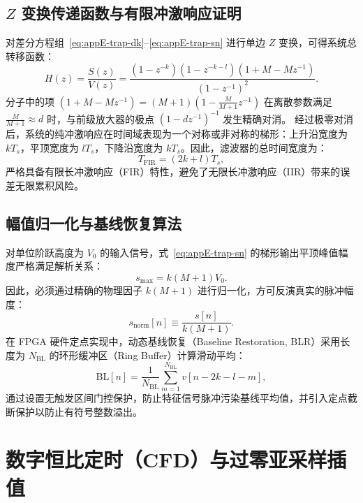 \subsection{$Z$ 变换传递函数与有限冲激响应证明}

对差分方程组~\eqref{eq:appE-trap-dk}--\eqref{eq:appE-trap-sn} 进行单边 $Z$ 变换，可得系统总转移函数：
\begin{equation}\label{eq:appE-trap-z-transform}
H(z) = \frac{S(z)}{V(z)} = \frac{(1 - z^{-k})(1 - z^{-k-l})(1 + M - M z^{-1})}{(1 - z^{-1})^2}.
\end{equation}
分子中的项 $(1 + M - M z^{-1}) = (M+1)(1 - \frac{M}{M+1} z^{-1})$ 在离散参数满足 $\frac{M}{M+1} \approx d$ 时，与前级放大器的极点 $(1 - d z^{-1})^{-1}$ 发生精确对消。
经过极零对消后，系统的纯冲激响应在时间域表现为一个对称或非对称的梯形：上升沿宽度为 $k T_s$，平顶宽度为 $l T_s$，下降沿宽度为 $k T_s$。因此，滤波器的总时间宽度为：
\begin{equation}\label{eq:appE-fir-length}
T_{\mathrm{FIR}} = (2k + l) T_s,
\end{equation}
严格具备有限长冲激响应（FIR）特性，避免了无限长冲激响应（IIR）带来的误差无限累积风险。

\subsection{幅值归一化与基线恢复算法}

对单位阶跃高度为 $V_0$ 的输入信号，式~\eqref{eq:appE-trap-sn} 的梯形输出平顶峰值幅度严格满足解析关系：
\begin{equation}\label{eq:appE-peak-amplitude}
s_{\max} = k (M + 1) V_0.
\end{equation}
因此，必须通过精确的物理因子 $k(M+1)$ 进行归一化，方可反演真实的脉冲幅度：
\begin{equation}\label{eq:appE-snorm}
s_{\mathrm{norm}}[n] \equiv \frac{s[n]}{k(M + 1)}.
\end{equation}
在 FPGA 硬件定点实现中，动态基线恢复（Baseline Restoration, BLR）采用长度为 $N_{\mathrm{BL}}$ 的环形缓冲区（Ring Buffer）计算滑动平均：
\begin{equation}\label{eq:appE-baseline-ma}
\mathrm{BL}[n] = \frac{1}{N_{\mathrm{BL}}} \sum_{m=1}^{N_{\mathrm{BL}}} v[n - 2k - l - m],
\end{equation}
通过设置无触发区间门控保护，防止特征信号脉冲污染基线平均值，并引入定点截断保护以防止有符号整数溢出。

\section{数字恒比定时（CFD）与过零亚采样插值}\label{sec:appE-cfd}

